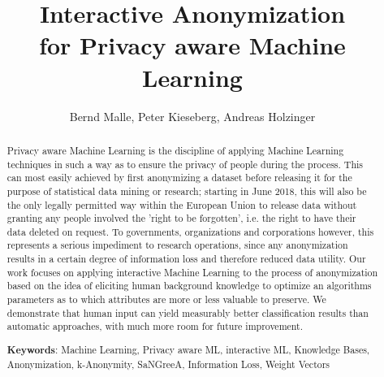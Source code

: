 \documentclass{llncs}
\begin{document}
\title{Interactive Anonymization\\
for Privacy aware Machine Learning}

\author{Bernd Malle, Peter Kieseberg, Andreas Holzinger}

	
\maketitle

\begin{abstract}

Privacy aware Machine Learning is the discipline of applying Machine Learning techniques in such a way as to ensure the privacy of people during the process. This can most easily achieved by first anonymizing a dataset before releasing it for the purpose of statistical data mining or research; starting in June 2018, this will also be the only legally permitted way within the European Union to release data without granting any people involved the 'right to be forgotten', i.e. the right to have their data deleted on request. To governments, organizations and corporations however, this represents a serious impediment to research operations, since any anonymization results in a certain degree of information loss and therefore reduced data utility. Our work focuses on applying interactive Machine Learning to the process of anonymization based on the idea of eliciting human background knowledge to optimize an algorithms parameters as to which attributes are more or less valuable to preserve. We demonstrate that human input can yield measurably better classification results than automatic approaches, with much more room for future improvement.


\medskip

\textbf{Keywords}: Machine Learning, Privacy aware ML, interactive ML, Knowledge Bases, Anonymization, k-Anonymity, SaNGreeA, Information Loss, Weight Vectors


\end{abstract}
\end{document}
